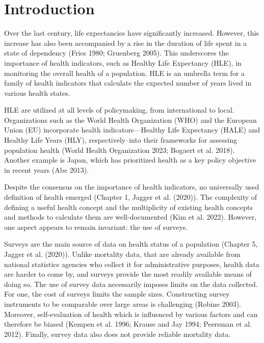 \documentclass{article}
\begin{document}
\hypertarget{introduction}{%
\section{Introduction}\label{introduction}}

Over the last century, life expectancies have significantly increased.
However, this increase has also been accompanied by a rise in the
duration of life spent in a state of dependency (Fries 1980; Gruenberg
2005). This underscores the importance of health indicators, such as
Healthy Life Expectancy (HLE), in monitoring the overall health of a
population. HLE is an umbrella term for a family of health indicators
that calculate the expected number of years lived in various health
states.

HLE are utilized at all levels of policymaking, from international to
local. Organizations such as the World Health Organization (WHO) and the
European Union (EU) incorporate health indicators---Healthy Life
Expectancy (HALE) and Healthy Life Years (HLY), respectively--into their
frameworks for assessing population health (World Health Organization
2023; Bogaert et al. 2018). Another example is Japan, which has
prioritized health as a key policy objective in recent years (Abe 2013).

Despite the consensus on the importance of health indicators, no
universally used definition of health emerged (Chapter 1, Jagger et al.
(2020)). The complexity of defining a useful health concept and the
multiplicity of existing health concepts and methods to calculate them
are well-documented (Kim et al. 2022). However, one aspect appears to
remain invariant: the use of surveys.

Surveys are the main source of data on health status of a population
(Chapter 5, Jagger et al. (2020)). Unlike mortality data, that are
already available from national statistics agencies who collect it for
administrative purposes, health data are harder to come by, and surveys
provide the most readily available means of doing so. The use of survey
data necessarily imposes limits on the data collected. For one, the cost
of surveys limits the sample sizes. Constructing survey instruments to
be comparable over large areas is challenging (Robine 2003). Moreover,
self-evaluation of health which is influenced by various factors and can
therefore be biased (Kempen et al. 1996; Krause and Jay 1994; Peersman
et al. 2012). Finally, survey data also does not provide reliable
mortality data.
\end{document}
